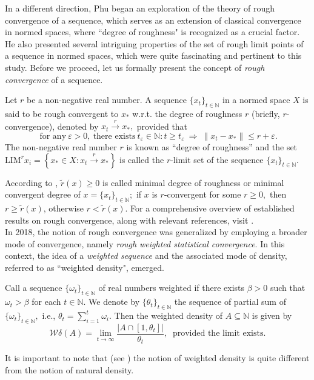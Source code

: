 \documentclass[reqno]{amsart}
\begin{document}
In a different direction, Phu \cite{phu2001rough,xuan2003rough} began an exploration of the theory of rough convergence of a sequence, which serves as an extension of classical convergence in normed spaces, where ``degree of roughness" is recognized as a crucial factor. He also presented several intriguing properties of the set of rough limit points of a sequence in normed spaces, which were quite fascinating and pertinent to this study. Before we proceed, let us formally present the concept of \textit{rough convergence} of a sequence.

\begin{definition}\cite[Page no. 199]{phu2001rough} \cite[Eq (1.1)]{xuan2003rough} Let $r$ be a non-negative real number. A sequence  $\{x_t\}_{t\in \mathbb{N}}$ in a normed space $X$ is said to be  rough convergent  to $x_*$ w.r.t. the degree of roughness $r$ (briefly, $r$-convergence), denoted by $x_t\xrightarrow{r}x_*,$  provided that
	\begin{equation*}~\mbox{for any}~ \varepsilon > 0,~\mbox{there exists}~ t_{\varepsilon} \in \mathbb{N}: t\geq t_{\varepsilon} ~\Rightarrow~ \|x_t - x_*\| \leq  r+ \varepsilon.\end{equation*}
	The  non-negative real number $r$ is known as ``degree of roughness'' and the set $\text{LIM}^r x_i=\left\{x_*\in X: x_t\xrightarrow{r}x_*\right\}$ is called the $r$-limit set of the sequence $\{x_t\}_{t\in \mathbb{N}}.$
\end{definition}
According to \cite[Eq (4.2)]{phu2001rough},  $\tilde{r}(x)\geq 0$ is called minimal degree of roughness or minimal convergent degree of  $x=\{x_t\}_{t\in\mathbb{N}};$  if $x$ is  $r$-convergent for some $r\geq 0,$ then $r\geq \tilde{r}(x)$, otherwise $r<\tilde{r}(x).$ 
For a comprehensive overview of established results on rough convergence, along with relevant references, visit \cite{aytarcore,SGSM2,listan2011characterization,phu2001rough,xuan2003rough}.\\



In 2018, the notion of rough convergence was generalized by employing a broader mode of convergence, namely \textit{rough weighted statistical convergence}. In this context, the idea of a \textit{weighted sequence} and the associated mode of density, referred to as ``weighted density", emerged.
\begin{definition}\cite[Page no. 884]{das2018characterization} \cite[Definition 2]{ghosal2021rough}
Call a sequence $\{\omega_t\}_{t\in\mathbb{N}}$ of real numbers weighted if there exists $\beta>0$ such that $\omega_t>\beta$ for each $t\in \mathbb{N}.$ We denote by $\{\theta_t\}_{t\in\mathbb{N}}$ the sequence of partial sum of $\{\omega_t\}_{t\in\mathbb{N}},$ i.e.,  $\theta_t=\displaystyle\sum_{i=1}^{t}\omega_i.$ Then the weighted density of $A\subseteq\mathbb{N}$ is given by 
	 $$\mathcal{W}\delta(A)=\lim_{t\to\infty}\frac{|A\cap [1, \theta_t]|}{\theta_t},~\mbox{ provided the limit exists}.$$
\end{definition}
It is important to note that (see \cite[Proposition 2]{ghosal2021rough}) the notion of weighted density is quite different from the notion of natural density.
\end{document}
